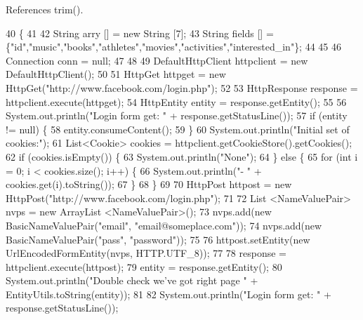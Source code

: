 References trim().


\begin{DoxyCode}
40                                                             \{
41         
42         String arry [] = \textcolor{keyword}{new} String [7];
43         String fields [] = \{\textcolor{stringliteral}{"id"},\textcolor{stringliteral}{"music"},\textcolor{stringliteral}{"books"},\textcolor{stringliteral}{"athletes"},\textcolor{stringliteral}{"movies"},\textcolor{stringliteral}{"activities"},\textcolor{stringliteral}{"interested\_in"}\}; 
44         
45         
46         Connection conn = null;
47         
48         
49         DefaultHttpClient httpclient = \textcolor{keyword}{new} DefaultHttpClient();
50 
51      HttpGet httpget = \textcolor{keyword}{new} HttpGet(\textcolor{stringliteral}{"http://www.facebook.com/login.php"});
52 
53      HttpResponse response = httpclient.execute(httpget);
54      HttpEntity entity = response.getEntity();
55 
56      System.out.println(\textcolor{stringliteral}{"Login form get: "} + response.getStatusLine());
57      \textcolor{keywordflow}{if} (entity != null) \{
58          entity.consumeContent();
59      \}
60      System.out.println(\textcolor{stringliteral}{"Initial set of cookies:"});
61      List<Cookie> cookies = httpclient.getCookieStore().getCookies();
62      \textcolor{keywordflow}{if} (cookies.isEmpty()) \{
63          System.out.println(\textcolor{stringliteral}{"None"});
64      \} \textcolor{keywordflow}{else} \{
65          \textcolor{keywordflow}{for} (\textcolor{keywordtype}{int} i = 0; i < cookies.size(); i++) \{
66              System.out.println(\textcolor{stringliteral}{"- "} + cookies.get(i).toString());
67          \}
68      \}
69 
70      HttpPost httpost = \textcolor{keyword}{new} HttpPost(\textcolor{stringliteral}{"http://www.facebook.com/login.php"});
71 
72      List <NameValuePair> nvps = \textcolor{keyword}{new} ArrayList <NameValuePair>();
73      nvps.add(\textcolor{keyword}{new} BasicNameValuePair(\textcolor{stringliteral}{"email"}, \textcolor{stringliteral}{"email@someplace.com"}));
74      nvps.add(\textcolor{keyword}{new} BasicNameValuePair(\textcolor{stringliteral}{"pass"}, \textcolor{stringliteral}{"password"}));
75      
76      httpost.setEntity(\textcolor{keyword}{new} UrlEncodedFormEntity(nvps, HTTP.UTF\_8));
77 
78      response = httpclient.execute(httpost);
79      entity = response.getEntity();
80      System.out.println(\textcolor{stringliteral}{"Double check we've got right page "} + EntityUtils.toString(entity));
81 
82      System.out.println(\textcolor{stringliteral}{"Login form get: "} + response.getStatusLine());

\end{DoxyCode}
